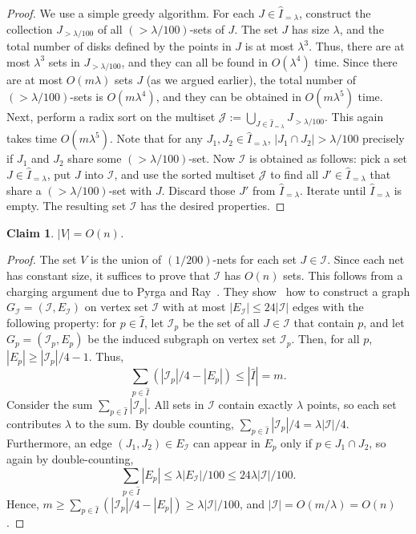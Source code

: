 \documentclass{siamltex}
\newcommand{\cI}{\mathcal{I}}
\newcommand{\eqdef}{:=}
\newtheorem{claim}[theorem]{Claim}
\begin{document}
\begin{proof} 
We use a simple greedy algorithm.
For each $J \in \hat I_{= \lambda}$, construct the collection
$J_{>\lambda/100}$ of all $(>\lambda/100)$-sets of $J$. The set $J$ has size
$\lambda$, and the total number of disks defined by the points in $J$
is at most $\lambda^3$. Thus, there are at most $\lambda^3$ sets in 
$J_{>\lambda/100}$,
and they can all be found in $O(\lambda^4)$ time.
Since there are at most $O(m\lambda)$ sets $J$ (as we argued earlier),
the total number of $(>\lambda/100)$-sets is $O(m \lambda^4)$, and
they can be obtained in $O(m \lambda^5)$ time. 
Next, perform a radix sort on the multiset 
$\mathcal{J} \eqdef \bigcup_{J \in \hat I_{=\lambda}} J_{>\lambda/100}$.
This again takes time $O(m\lambda^5)$.
Note that for any 
$J_1, J_2 \in \hat I_{=\lambda}$, $|J_1 \cap J_2| > \lambda/100$
precisely if $J_1$ and $J_2$ share some $(> \lambda/100)$-set.
Now $\cI$ is obtained as follows: pick a set $J \in \hat I _{=\lambda}$,
put $J$ into $\cI$, and use the sorted multiset $\mathcal{J}$ to find all 
$J' \in \hat I_{=\lambda}$ that share a $(>\lambda/100)$-set with $J$. Discard
those $J'$ from $\hat I_{=\lambda}$. Iterate until $\hat I_{=\lambda}$ 
is empty. The resulting set $\cI$ has the desired properties.
\end{proof}

\medskip

\begin{claim} \label{clm:netsize} $|V| = O(n)$.
\end{claim}

\begin{proof} The set $V$ is the union of $(1/200)$-nets
for each set $J \in \cI$. Since each net has constant size,
it suffices to prove that $\cI$ has $O(n)$ sets. This follows from
a charging argument due to Pyrga and Ray~\cite[Theorem~12]{PyrgaRa08}.
They show~\cite[Lemma~7]{PyrgaRa08} how to construct a graph 
$G_\cI = (\cI, E_\cI)$
on vertex set $\cI$ with at most $|E_\cI| \leq 24|\cI|$ edges with 
the following property: for $p \in \hat I$, let $\cI_p$ be the set 
of all $J \in \cI$ that contain $p$, and
let $G_p = (\cI_p, E_p)$ be the induced subgraph 
on vertex set $\cI_p$. Then, for all $p$,  $|E_p| \geq |\cI_p|/4-1$.
Thus,
\[
\sum_{p \in \hat I} (|\cI_p|/4 - |E_p|) \leq |\hat I| = m.
\]
Consider the sum $\sum_{p \in \hat I} |\cI_p|$. All sets
in $\cI$ contain exactly $\lambda$ points, so each set
contributes $\lambda$ to the sum. By double counting,
$\sum_{p \in \hat I} |\cI_p|/4 = \lambda|\cI|/4$. 
Furthermore, an edge 
$(J_1, J_2) \in E_\cI$ can
appear in $E_p$ only if $p \in J_1 \cap J_2$, so again
by double-counting,
\[
\sum_{p \in \hat I} |E_p| \leq \lambda |E_\cI| /100 \leq 24 \lambda |\cI|/100.
\]
Hence, 
$m \geq \sum_{p \in \hat I} (|\cI_p|/4 - |E_p|) \geq \lambda|\cI|/100$, and
$|\cI| = O(m/\lambda) = O(n)$.
\end{proof}
\end{document}
